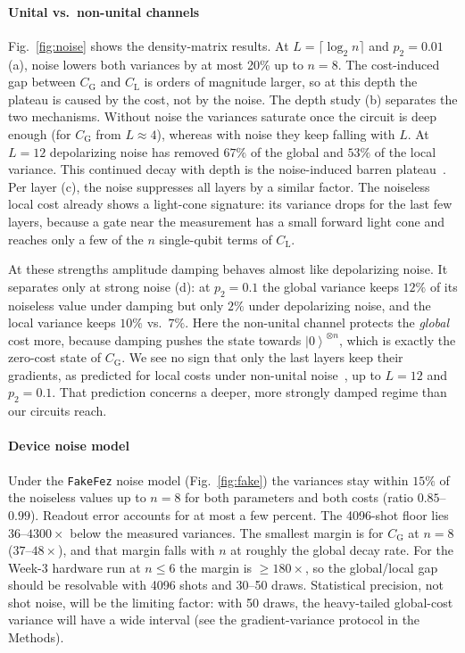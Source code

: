 \documentclass[conference]{IEEEtran}
\providecommand{\ket}[1]{\left|#1\right\rangle}
\newcommand{\CG}{C_{\mathrm{G}}}
\newcommand{\CL}{C_{\mathrm{L}}}
\begin{document}
\paragraph*{Unital vs.\ non-unital channels} Fig.~\ref{fig:noise} shows the
density-matrix results. At $L=\lceil\log_2n\rceil$ and $p_2=0.01$ (a), noise
lowers both variances by at most 20\% up to $n=8$. The cost-induced gap between
$\CG$ and $\CL$ is orders of magnitude larger, so at this depth the plateau is
caused by the cost, not by the noise. The depth study (b) separates the two
mechanisms. Without noise the variances saturate once the circuit is deep
enough (for $\CG$ from $L\approx4$), whereas with
noise they keep falling with $L$. At $L=12$ depolarizing noise has removed
$67\%$ of the global and $53\%$ of the local variance. This continued decay with
depth is the noise-induced barren plateau~\cite{wang2021}. Per layer (c), the
noise suppresses all layers by a similar factor. The noiseless local cost
already shows a light-cone signature: its variance drops for the last few
layers, because a gate near the measurement has a small forward light cone and
reaches only a few of the $n$ single-qubit terms of $\CL$.

At these strengths amplitude damping behaves almost like depolarizing noise.
It separates only at strong noise (d): at $p_2=0.1$ the global variance keeps
$12\%$ of its noiseless value under damping but only $2\%$ under depolarizing
noise, and the local variance keeps $10\%$ vs.\ $7\%$. Here the non-unital channel
protects the \emph{global} cost more, because damping pushes the state towards
$\ket{0}^{\otimes n}$, which is exactly the zero-cost state of $\CG$.
We see no sign that only the last layers keep their gradients, as predicted
for local costs under non-unital noise~\cite{mele2026}, up to
$L=12$ and $p_2=0.1$. That prediction concerns a deeper, more strongly damped
regime than our circuits reach.

\paragraph*{Device noise model} Under the \texttt{FakeFez} noise model
(Fig.~\ref{fig:fake}) the variances stay within $15\%$ of the noiseless
values up to $n=8$ for both parameters and both costs (ratio $0.85$--$0.99$).
Readout error accounts for at most a few percent. The 4096-shot floor lies
$36$--$4300\times$ below the measured variances. The smallest margin is for $\CG$
at $n=8$ ($37$--$48\times$), and that margin falls with $n$ at roughly the
global decay rate. For the Week-3 hardware run at $n\le6$ the margin is
$\ge180\times$, so the global/local gap should be resolvable with 4096 shots
and 30--50 draws. Statistical precision, not shot noise, will be the
limiting factor: with 50 draws, the heavy-tailed global-cost variance will have a
wide interval (see the gradient-variance protocol in the Methods).
\end{document}
